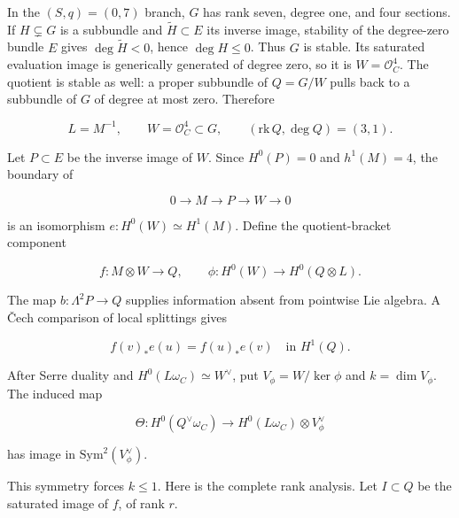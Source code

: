 \documentclass[11pt]{article}
\theoremstyle{definition}
\begin{document}
In the \((S,q)=(0,7)\) branch, \(G\) has rank seven, degree one, and
four sections. If \(H\subsetneq G\) is a subbundle and
\(\widetilde H\subset E\) its inverse image, stability of the
degree-zero bundle \(E\) gives \(\deg\widetilde H<0\), hence
\(\deg H\le0\). Thus \(G\) is stable. Its saturated evaluation image is
generically generated of degree zero, so it is \(W=\mathcal O_C^4\). The
quotient is stable as well: a proper subbundle of \(Q=G/W\) pulls back
to a subbundle of \(G\) of degree at most zero. Therefore

\[L=M^{-1},\qquad
W=\mathcal O_C^4\subset G,\qquad
(\mathrm{rk}\,Q,\deg Q)=(3,1).\]

Let \(P\subset E\) be the inverse image of \(W\). Since \(H^0(P)=0\) and
\(h^1(M)=4\), the boundary of

\[0\longrightarrow M\longrightarrow P\longrightarrow W\longrightarrow0\]

is an isomorphism \(e:H^0(W)\simeq H^1(M)\). Define the quotient-bracket
component

\[f:M\otimes W\longrightarrow Q,\qquad
\phi:H^0(W)\longrightarrow H^0(Q\otimes L).\]

The map \(b:\Lambda^2P\to Q\) supplies information absent from pointwise
Lie algebra. A \v{C}ech comparison of local splittings gives

\[f(v)_*e(u)=f(u)_*e(v)\quad\text{in }H^1(Q).\]

After Serre duality and \(H^0(L\omega_C)\simeq W^\vee\), put
\(V_\phi=W/\ker\phi\) and \(k=\dim V_\phi\). The induced map

\[\Theta:H^0(Q^\vee\omega_C)
\longrightarrow H^0(L\omega_C)\otimes V_\phi^\vee\]

has image in \(\mathrm{Sym}^2(V_\phi^\vee)\).

This symmetry forces \(k\le1\). Here is the complete rank analysis. Let
\(I\subset Q\) be the saturated image of \(f\), of rank \(r\).
\end{document}
